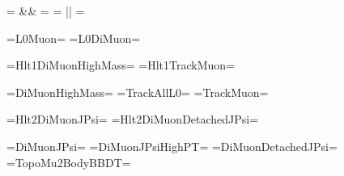 
\newcommand{\HLTOne}{HLT1\xspace}
\newcommand{\HLTTwo}{HLT2\xspace}

= && =
\newcommand{\VerbAnd}{\UseVerb{tmp_And}\xspace}
= || =
\newcommand{\VerbOr}{\UseVerb{tmp_Or}\xspace}

=L0Muon=
\newcommand{\LZeroMuon}{\UseVerb{tmp_lzeromuon}\xspace}
=L0DiMuon=
\newcommand{\LZeroDiMuon}{\UseVerb{tmp_lzerodimuondec}\xspace}

=Hlt1DiMuonHighMass=
\newcommand{\HLTOneDiMuonHighMass}{\UseVerb{tmp_hltonedimuonhighmass}\xspace}
=Hlt1TrackMuon=
\newcommand{\HLTOneTrackMuon}{\UseVerb{tmp_hltonetrackmuon}\xspace}

=DiMuonHighMass=
\newcommand{\DiMuonHighMass}{\UseVerb{tmp_dimuonhighmass}\xspace}
=TrackAllL0=
\newcommand{\TrackAllLZero}{\UseVerb{tmp_trackalllzero}\xspace}
=TrackMuon=
\newcommand{\TrackMuon}{\UseVerb{tmp_trackmuon}\xspace}

=Hlt2DiMuonJPsi=
\newcommand{\HLTTwoDiMuonJpsi}{\UseVerb{tmp_hlttwodumuonjpsi}\xspace}
=Hlt2DiMuonDetachedJPsi=
\newcommand{\HLTTwoDiMuonDetachedJpsi}{\UseVerb{tmp_hlttwodimuondetachedjpsi}\xspace}

=DiMuonJPsi=
\newcommand{\DiMuonJPsi}{\UseVerb{tmp_dimuonjpsi}\xspace}
=DiMuonJPsiHighPT=
\newcommand{\DiMuonJPsiHighPT}{\UseVerb{tmp_dimuonjpsihighpt}\xspace}
=DiMuonDetachedJPsi=
\newcommand{\DiMuonDetachedJPsi}{\UseVerb{tmp_dimuondetachedjpsi}\xspace}
=TopoMu2BodyBBDT=
\newcommand{\TopoMuTwoBodyBBDT}{\UseVerb{tmp_topomutwobodybbdt}\xspace}
